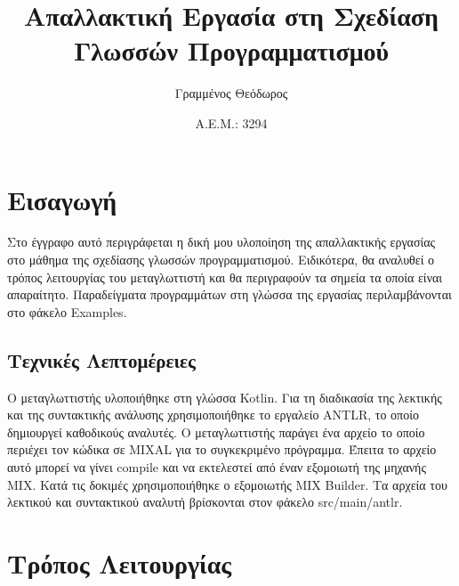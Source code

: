\documentclass[12pt,a4paper]{report}
\author{Γραμμένος Θεόδωρος}
\title{Απαλλακτική Εργασία στη Σχεδίαση Γλωσσών Προγραμματισμού}
\date{Α.Ε.Μ.: 3294}
\begin{document}
\maketitle
\tableofcontents
\chapter{Εισαγωγή}
Στο έγγραφο αυτό περιγράφεται η δική μου υλοποίηση της απαλλακτικής εργασίας
στο μάθημα της σχεδίασης γλωσσών προγραμματισμού. Ειδικότερα, θα αναλυθεί 
ο τρόπος λειτουργίας του μεταγλωττιστή και θα περιγραφούν τα σημεία τα οποία 
είναι απαραίτητο. Παραδείγματα προγραμμάτων στη γλώσσα της εργασίας περιλαμβάνονται 
στο φάκελο Examples.
\section{Τεχνικές Λεπτομέρειες}
Ο μεταγλωττιστής υλοποιήθηκε στη γλώσσα Kotlin. Για τη διαδικασία της λεκτικής  
και της συντακτικής ανάλυσης χρησιμοποιήθηκε το εργαλείο ANTLR, το οποίο 
δημιουργεί καθοδικούς αναλυτές. Ο μεταγλωττιστής παράγει ένα αρχείο το οποίο 
περιέχει τον κώδικα σε MIXAL για το συγκεκριμένο πρόγραμμα. Έπειτα το αρχείο 
αυτό μπορεί να γίνει compile και να εκτελεστεί από έναν εξομοιωτή της 
μηχανής MIX. Κατά τις δοκιμές χρησιμοποιήθηκε ο εξομοιωτής MIX Builder. Τα αρχεία του 
λεκτικού και συντακτικού αναλυτή βρίσκονται στον φάκελο src/main/antlr.
\chapter{Τρόπος Λειτουργίας}
\end{document}
